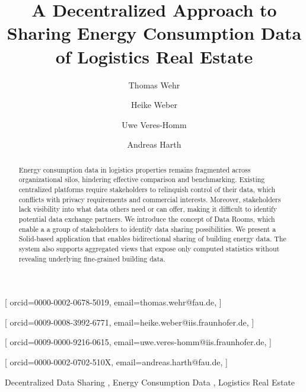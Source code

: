 \documentclass[
]{ceurart}
\begin{document}



\title{A Decentralized Approach to Sharing Energy Consumption Data of Logistics Real Estate}
\author[1]{Thomas Wehr}[%
orcid=0000-0002-0678-5019,
email=thomas.wehr@fau.de,
]
\author[2]{Heike Weber}[%
orcid=0009-0008-3992-6771,
email=heike.weber@iis.fraunhofer.de,
]
\author[2]{Uwe Veres-Homm}[%
orcid=0009-0000-9216-0615,
email=uwe.veres-homm@iis.fraunhofer.de,
]
\author[1,2]{Andreas Harth}[%
orcid=0000-0002-0702-510X,
email=andreas.harth@fau.de,
]
\address[1]{Friedrich-Alexander-Universität Erlangen-Nürnberg, Nuremberg, Germany}
\address[2]{Fraunhofer Institute for Integrated Circuits IIS, Nuremberg, Germany}

\begin{abstract}
Energy consumption data in logistics properties remains fragmented across organizational silos, hindering effective comparison and benchmarking.
Existing centralized platforms require stakeholders to relinquish control of their data, which conflicts with privacy requirements and commercial interests.
Moreover, stakeholders lack visibility into what data others need or can offer, making it difficult to identify potential data exchange partners.
We introduce the concept of Data Rooms, which enable a a group of stakeholders to identify data sharing possibilities.
We present a Solid-based application that enables bidirectional sharing of building energy data.
The system also supports aggregated views that expose only computed statistics without revealing underlying fine-grained building data. 
\end{abstract}

\begin{keywords}
  Decentralized Data Sharing \sep
  Energy Consumption Data \sep
  Logistics Real Estate
\end{keywords}
\end{document}
